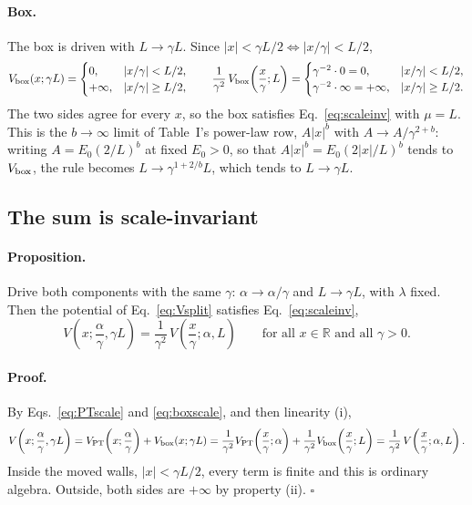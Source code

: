 \documentclass[11pt]{article}
\numberwithin{equation}{section}
\begin{document}
\paragraph{Box.} The box is driven with $L\to\gamma L$. Since $|x|<\gamma L/2\iff|x/\gamma|<L/2$,
\begin{equation}
V_{\rm box}(x;\gamma L)=\begin{cases}0,&|x/\gamma|<L/2,\\+\infty,&|x/\gamma|\ge L/2,\end{cases}
\qquad
\frac{1}{\gamma^2}\,V_{\rm box}\!\left(\frac{x}{\gamma};L\right)=\begin{cases}\gamma^{-2}\cdot0=0,&|x/\gamma|<L/2,\\\gamma^{-2}\cdot\infty=+\infty,&|x/\gamma|\ge L/2.\end{cases}
\label{eq:boxscale}
\end{equation}
The two sides agree for every $x$, so the box satisfies Eq.~\eqref{eq:scaleinv} with $\mu=L$. This is the $b\to\infty$ limit of Table~I's power-law row, $A|x|^b$ with $A\to A/\gamma^{2+b}$: writing $A=E_0(2/L)^b$ at fixed $E_0>0$, so that $A|x|^b=E_0(2|x|/L)^b$ tends to $V_{\rm box}$, the rule becomes $L\to\gamma^{1+2/b}L$, which tends to $L\to\gamma L$.

\subsection{The sum is scale-invariant}
\paragraph{Proposition.} Drive both components with the same $\gamma$: $\alpha\to\alpha/\gamma$ and $L\to\gamma L$, with $\lambda$ fixed. Then the potential of Eq.~\eqref{eq:Vsplit} satisfies Eq.~\eqref{eq:scaleinv},
\begin{equation}
V\!\left(x;\frac{\alpha}{\gamma},\gamma L\right)=\frac{1}{\gamma^2}\,V\!\left(\frac{x}{\gamma};\alpha,L\right)\qquad\text{for all }x\in\mathbb R\text{ and all }\gamma>0 .
\label{eq:sumscale}
\end{equation}

\paragraph{Proof.} By Eqs.~\eqref{eq:PTscale} and \eqref{eq:boxscale}, and then linearity (i),
\[
V\!\left(x;\frac{\alpha}{\gamma},\gamma L\right)=V_{\rm PT}\!\left(x;\frac{\alpha}{\gamma}\right)+V_{\rm box}(x;\gamma L)
=\frac{1}{\gamma^2}V_{\rm PT}\!\left(\frac x\gamma;\alpha\right)+\frac{1}{\gamma^2}V_{\rm box}\!\left(\frac x\gamma;L\right)
=\frac{1}{\gamma^2}\,V\!\left(\frac{x}{\gamma};\alpha,L\right).
\]
Inside the moved walls, $|x|<\gamma L/2$, every term is finite and this is ordinary algebra. Outside, both sides are $+\infty$ by property (ii). $\square$
\end{document}
